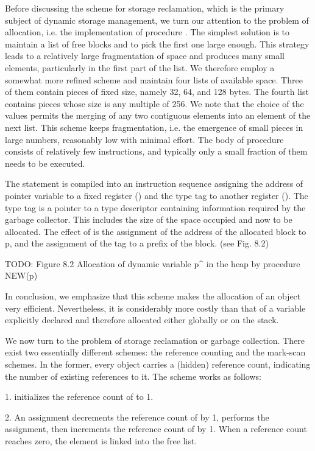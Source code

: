 Before discussing the scheme for storage reclamation, which is the primary subject of dynamic storage management, we turn our attention to the problem of allocation, i.e. the implementation of procedure . The simplest solution is to maintain a list of free blocks and to pick the first one large enough. This strategy leads to a relatively large fragmentation of space and produces many small elements, particularly in the first part of the list. We therefore employ a somewhat more refined scheme and maintain four lists of available space. Three of them contain pieces of fixed size, namely 32, 64, and 128 bytes. The fourth list contains pieces whose size is any multiple of 256. We note that the choice of the values permits the merging of any two contiguous elements into an element of the next list. This scheme keeps fragmentation, i.e. the emergence of small pieces in large numbers, reasonably low with minimal effort. The body of procedure  consists of relatively few instructions, and typically only a small fraction of them needs to be executed.

The statement  is compiled into an instruction sequence assigning the address of pointer variable  to a fixed register () and the type tag to another register (). The type tag is a pointer to a type descriptor containing information required by the garbage collector. This includes the size of the space occupied and now to be allocated. The effect of  is the assignment of the address of the allocated block to p, and the assignment of the tag to a prefix of the block. (see Fig. 8.2)

TODO: Figure 8.2 Allocation of dynamic variable p^ in the heap by procedure NEW(p)

In conclusion, we emphasize that this scheme makes the allocation of an object very efficient. Nevertheless, it is considerably more costly than that of a variable explicitly declared and therefore allocated either globally or on the stack.

We now turn to the problem of storage reclamation or garbage collection. There exist two essentially different schemes: the reference counting and the mark-scan schemes. In the former, every object carries a (hidden) reference count, indicating the number of existing references to it. The scheme works as follows:

1.  initializes the reference count of  to 1.

2. An assignment  decrements the reference count of  by 1, performs the assignment, then increments the reference count of  by 1. When a reference count reaches zero, the element is linked into the free list.

